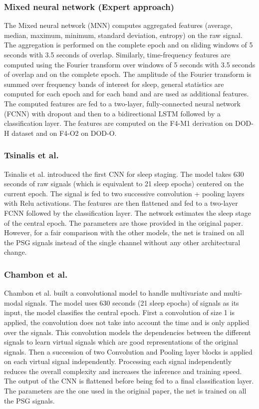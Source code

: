 \documentclass[journal]{IEEEtran}
\begin{document}
\subsubsection{Mixed neural network (Expert approach) \cite{Dong2018}}

The Mixed neural network (MNN) computes aggregated features (average, median, maximum, minimum, standard deviation, entropy) on the raw signal. The aggregation is performed on the complete epoch and on sliding windows of 5 seconds with 3.5 seconds of overlap. Similarly, time-frequency features are computed using the Fourier transform over windows of 5 seconds with 3.5 seconds of overlap and on the complete epoch. The amplitude of the Fourier transform is summed over frequency bands of interest for sleep, general statistics are computed for each epoch and for each band and are used as additional features. The computed features are fed to a two-layer, fully-connected neural network (FCNN) with dropout and then to a bidirectional LSTM followed by a classification layer. The features are computed on the F4-M1 derivation on DOD-H dataset and on F4-O2 on DOD-O.

\subsubsection{Tsinalis et al. \cite{Tsinalis2016a}}
Tsinalis et al. \cite{Tsinalis2016a} introduced the first CNN for sleep staging. The model takes 630 seconds of raw signals (which is equivalent to 21 sleep epochs) centered on the current epoch. The signal is fed to two successive convolution + pooling layers with Relu activations. The features are then flattened and fed to a two-layer FCNN followed by the classification layer. The network estimates the sleep stage of the central epoch. The parameters are those provided in the original paper. However, for a fair comparison with the other models, the net is trained on all the PSG signals instead of the single channel without any other architectural change.

\subsubsection{Chambon et al. \cite{Chambon2018}}
Chambon et al. \cite{Chambon2018} built a convolutional model to handle multivariate and multi-modal signals. The model uses 630 seconds (21 sleep epochs) of signals as its input, the model classifies the central epoch. First a convolution of size 1 is applied, the convolution does not take into account the time and is only applied over the signals. This convolution models the dependencies between the different signals to learn virtual signals which are good representations of the original signals. Then a succession of two Convolution and Pooling layer blocks is applied on each virtual signal independently. Processing each signal independently reduces the overall complexity and increases the inference and training speed. The output of the CNN is flattened before being fed to a final classification layer. The parameters are the one used in the original paper, the net is trained on all the PSG signals. 
\end{document}
